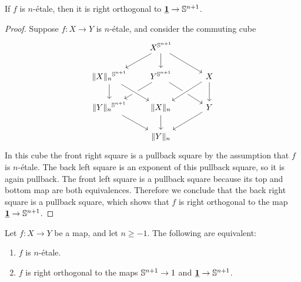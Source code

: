 \documentclass[9pt,twosided]{amsart}
\begin{document}
\begin{lem}
If $f$ is $n$-\'etale, then it is right orthogonal to $\underline{\mathbf{1}}\to\mathbb{S}^{n+1}$.
\end{lem}

\begin{proof}
Suppose $f:X\to Y$ is $n$-\'etale, and consider the commuting cube
\begin{equation*}
\begin{tikzcd}
&[-1ex] X^{\sphere{n+1}} \arrow[dl] \arrow[d] \arrow[dr] &[2ex] \\
\trunc{n}{X}^{\sphere{n+1}} \arrow[d] & Y^{\sphere{n+1}} \arrow[dl] \arrow[dr] & X \arrow[dl,crossing over] \arrow[d] \\
\trunc{n}{Y}^{\sphere{n+1}} \arrow[dr] & \trunc{n}{X} \arrow[d] \arrow[from=ul,crossing over] & Y \arrow[dl] \\
& \trunc{n}{Y}
\end{tikzcd}
\end{equation*}
In this cube the front right square is a pullback square by the assumption that $f$ is $n$-\'etale. The back left square is an exponent of this pullback square, so it is again pullback. The front left square is a pullback square because its top and bottom map are both equivalences. Therefore we conclude that the back right square is a pullback square, which shows that $f$ is right orthogonal to the map $\underline{\mathbf{1}}\to\mathbb{S}^{n+1}$.
\end{proof}

\begin{conj}
Let $f:X\to Y$ be a map, and let $n\geq -1$. The following are equivalent:
\begin{enumerate}
\item $f$ is $n$-\'etale.
\item $f$ is right orthogonal to the maps $\mathbb{S}^{n+1}\to 1$ and $\underline{\mathbf{1}}\to\mathbb{S}^{n+1}$. 
\end{enumerate}
\end{conj}
\end{document}

